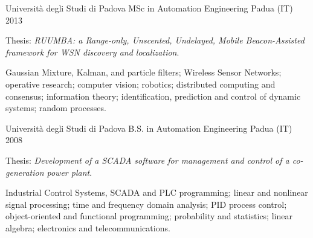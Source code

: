 
\begin{cventries}

	\cventry%
		{Università degli Studi di Padova}
		{MSc in Automation Engineering}
		{Padua (IT)}
		{2013}
		{\begin{cvitems}
			\item {Thesis: \emph{RUUMBA: a Range-only, Unscented, Undelayed, Mobile Beacon-Assisted framework for WSN discovery and localization}.}
			\item {%
				Gaussian Mixture, Kalman, and particle filters;
				Wireless Sensor Networks;
				operative research;
				computer vision;
				robotics;
				distributed computing and consensus;
				information theory;
				identification, prediction and control of dynamic systems;
				random processes.
				}
		\end{cvitems}}

	\cventry%
		{Università degli Studi di Padova}
		{B.S. in Automation Engineering}
		{Padua (IT)}
		{2008}
		{\begin{cvitems}
			\item {Thesis: \emph{Development of a SCADA software for management and control of a co-generation power plant}.}
			\item {%
				Industrial Control Systems, SCADA and PLC programming;
				linear and nonlinear signal processing;
				time and frequency domain analysis;
				PID process control;
				object-oriented and functional programming;
				probability and statistics;
				linear algebra;
				electronics and telecommunications.
				}
		\end{cvitems}}


\end{cventries}
